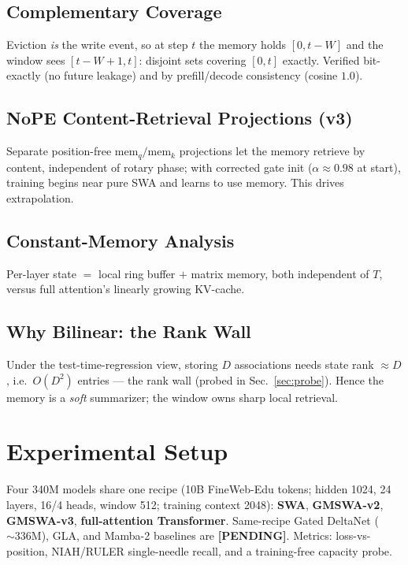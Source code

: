\documentclass[11pt]{article}
\newcommand{\pending}{\textbf{[PENDING]}}
\begin{document}
\subsection{Complementary Coverage}
Eviction \emph{is} the write event, so at step $t$ the memory holds $[0,t{-}W]$ and the
window sees $[t{-}W{+}1,t]$: disjoint sets covering $[0,t]$ exactly. Verified bit-exactly
(no future leakage) and by prefill/decode consistency (cosine $1.0$).

\subsection{NoPE Content-Retrieval Projections (v3)}
Separate position-free $\text{mem}_q/\text{mem}_k$ projections let the memory retrieve by
content, independent of rotary phase; with corrected gate init ($\alpha\!\approx\!0.98$ at
start), training begins near pure SWA and learns to use memory. This drives extrapolation.

\subsection{Constant-Memory Analysis}
Per-layer state $=$ local ring buffer $+$ matrix memory, both independent of $T$, versus
full attention's linearly growing KV-cache.

\subsection{Why Bilinear: the Rank Wall}
Under the test-time-regression view, storing $D$ associations needs state rank $\approx D$,
i.e.\ $O(D^2)$ entries --- the rank wall (probed in Sec.~\ref{sec:probe}). Hence the memory
is a \emph{soft} summarizer; the window owns sharp local retrieval.

\section{Experimental Setup}
Four 340M models share one recipe (10B FineWeb-Edu tokens; hidden 1024, 24 layers,
16/4 heads, window 512; training context 2048): \textbf{SWA}, \textbf{GMSWA-v2},
\textbf{GMSWA-v3}, \textbf{full-attention Transformer}. Same-recipe Gated DeltaNet
(${\sim}336$M), GLA, and Mamba-2 baselines are \pending. Metrics: loss-vs-position,
NIAH/RULER single-needle recall, and a training-free capacity probe.

\end{document}
